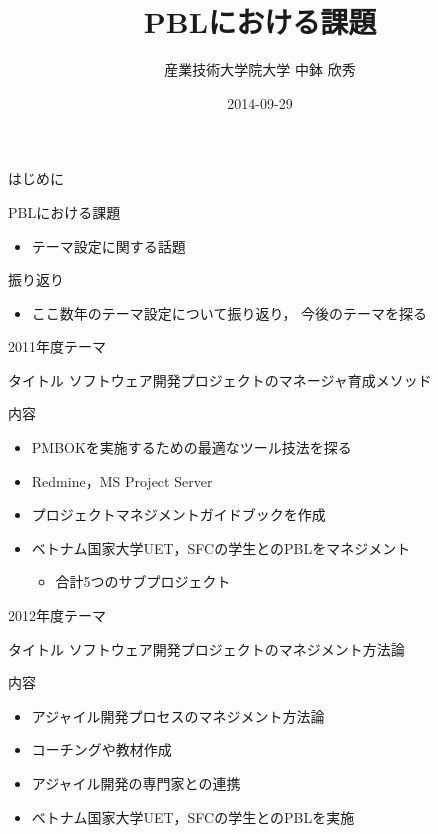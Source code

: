 \documentclass[t]{beamer}
\author{産業技術大学院大学 \linebreak 中鉢 欣秀}
\date{2014-09-29}
\title{PBLにおける課題}
\begin{document}
\maketitle

\begin{frame}[label=sec-1]{はじめに}
\begin{block}{PBLにおける課題}
\begin{itemize}
\item テーマ設定に関する話題
\end{itemize}
\end{block}
\begin{block}{振り返り}
\begin{itemize}
\item ここ数年のテーマ設定について振り返り，
今後のテーマを探る
\end{itemize}
\end{block}
\end{frame}

\begin{frame}[label=sec-2]{2011年度テーマ}
\begin{block}{タイトル}
ソフトウェア開発プロジェクトのマネージャ育成メソッド
\end{block}
\begin{block}{内容}
\begin{itemize}
\item PMBOKを実施するための最適なツール技法を探る
\item Redmine，MS Project Server
\item プロジェクトマネジメントガイドブックを作成
\item ベトナム国家大学UET，SFCの学生とのPBLをマネジメント
\begin{itemize}
\item 合計5つのサブプロジェクト
\end{itemize}
\end{itemize}
\end{block}
\end{frame}

\begin{frame}[label=sec-3]{2012年度テーマ}
\begin{block}{タイトル}
ソフトウェア開発プロジェクトのマネジメント方法論
\end{block}
\begin{block}{内容}
\begin{itemize}
\item アジャイル開発プロセスのマネジメント方法論
\item コーチングや教材作成
\item アジャイル開発の専門家との連携
\item ベトナム国家大学UET，SFCの学生とのPBLを実施
\end{itemize}
\end{block}
\end{frame}
\end{document}
